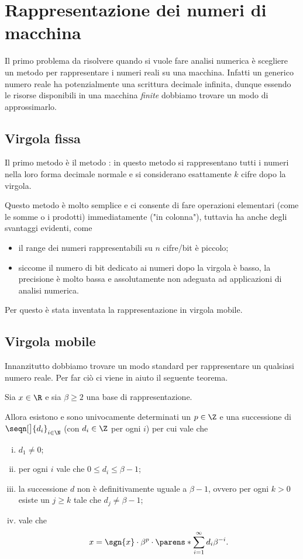 \section{Rappresentazione dei numeri di macchina}

Il primo problema da risolvere quando si vuole fare analisi numerica è scegliere un metodo per rappresentare i numeri reali su una macchina. Infatti un generico numero reale ha potenzialmente una scrittura decimale infinita, dunque essendo le risorse disponibili in una macchina \emph{finite} dobbiamo trovare un modo di approssimarlo. 

\subsection{Virgola fissa}
Il primo metodo è il metodo : in questo metodo si rappresentano tutti i numeri nella loro forma decimale normale e si considerano esattamente $k$ cifre dopo la virgola.

Questo metodo è molto semplice e ci consente di fare operazioni elementari (come le somme o i prodotti) immediatamente ("in colonna"), tuttavia ha anche degli svantaggi evidenti, come \begin{itemize}
    \item il range dei numeri rappresentabili su $n$ cifre/bit è piccolo;
    \item siccome il numero di bit dedicato ai numeri dopo la virgola è basso, la precisione è molto bassa e assolutamente non adeguata ad applicazioni di analisi numerica.
\end{itemize}
Per questo è stata inventata la rappresentazione in virgola mobile.

\subsection{Virgola mobile}
Innanzitutto dobbiamo trovare un modo standard per rappresentare un qualsiasi numero reale. Per far ciò ci viene in aiuto il seguente teorema.

\begin{theorem}
    \label{th:rapp_base}
    Sia $x \in \R$ e sia $\beta \geq 2$ una base di rappresentazione. 
    
    Allora esistono e sono univocamente determinati un  $p \in \Z$ e una successione di  $\seqn[\big]{d_i}_{i \in \N}$ (con $d_i \in \Z$ per ogni $i$) per cui vale che
    \begin{enumerate}[(i)]
        \item $d_1 \neq 0$;
        \item per ogni $i$ vale che $0 \leq d_i \leq \beta - 1$;
        \item la successione $d$ non è definitivamente uguale a $\beta - 1$, ovvero per ogni $k > 0$ esiste un $j \geq k$ tale che $d_j \neq \beta - 1$;
        \item vale che \[
            x = \sgn{x} \cdot \beta^p \cdot \parens*{\sum_{i=1}^\infty d_i\beta^{-i}}.
        \] 
    \end{enumerate}
\end{theorem}

